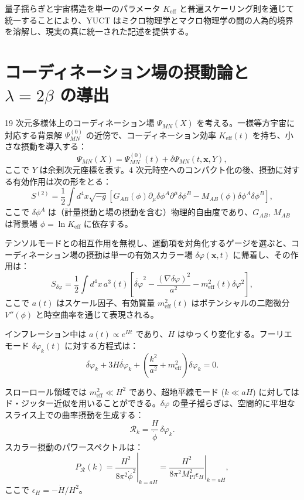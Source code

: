 \documentclass[11pt,a4paper]{article}
\newcommand{\Keff}{K_{\mathrm{eff}}}
\newcommand{\Mpl}{M_{\mathrm{Pl}}}
\begin{document}
	量子揺らぎと宇宙構造を単一のパラメータ \(K_{\mathrm{eff}}\) と普遍スケーリング則を通じて統一することにより、YUCT はミクロ物理学とマクロ物理学の間の人為的境界を溶解し、現実の真に統一された記述を提供する。
	
	\appendix
	\section{コーディネーション場の摂動論と \(\lambda = 2\beta\) の導出}
	\label{app:perturbations}
	
	19 次元多様体上のコーディネーション場 \(\Psi_{MN}(X)\) を考える。一様等方宇宙に対応する背景解 \(\Psi^{(0)}_{MN}\) の近傍で、コーディネーション効率 \(\Keff(t)\) を持ち、小さな摂動を導入する：
	\begin{equation}
		\Psi_{MN}(X) = \Psi^{(0)}_{MN}(t) + \delta\Psi_{MN}(t,\mathbf{x},Y),
	\end{equation}
	ここで \(Y\) は余剰次元座標を表す。4 次元時空へのコンパクト化の後、摂動に対する有効作用は次の形をとる：
	\begin{equation}
		S^{(2)} = \frac{1}{2} \int d^4x \sqrt{-g} \left[ G_{AB}(\phi) \partial_\mu \delta\phi^A \partial^\mu \delta\phi^B - M_{AB}(\phi) \delta\phi^A \delta\phi^B \right],
	\end{equation}
	ここで \(\delta\phi^A\) は（計量摂動と場の摂動を含む）物理的自由度であり、\(G_{AB}\), \(M_{AB}\) は背景場 \(\phi = \ln\Keff\) に依存する。
	
	テンソルモードとの相互作用を無視し、運動項を対角化するゲージを選ぶと、コーディネーション場の摂動は単一の有効スカラー場 \(\delta\varphi(\mathbf{x},t)\) に帰着し、その作用は：
	\begin{equation}
		S_{\delta\varphi} = \frac{1}{2} \int d^4x \, a^3(t) \left[ \dot{\delta\varphi}^2 - \frac{(\nabla\delta\varphi)^2}{a^2} - m_{\mathrm{eff}}^2(t) \delta\varphi^2 \right],
	\end{equation}
	ここで \(a(t)\) はスケール因子、有効質量 \(m_{\mathrm{eff}}^2(t)\) はポテンシャルの二階微分 \(V''(\phi)\) と時空曲率を通じて表現される。
	
	インフレーション中は \(a(t) \propto e^{Ht}\) であり、\(H\) はゆっくり変化する。フーリエモード \(\delta\varphi_k(t)\) に対する方程式は：
	\begin{equation}
		\ddot{\delta\varphi}_k + 3H\dot{\delta\varphi}_k + \left( \frac{k^2}{a^2} + m_{\mathrm{eff}}^2 \right) \delta\varphi_k = 0.
	\end{equation}
	
	スローロール領域では \(m_{\mathrm{eff}}^2 \ll H^2\) であり、超地平線モード (\(k \ll aH\)) に対してはド・ジッター近似を用いることができる。\(\delta\varphi\) の量子揺らぎは、空間的に平坦なスライス上での曲率摂動を生成する：
	\begin{equation}
		\mathcal{R}_k = \frac{H}{\dot{\phi}} \, \delta\varphi_k.
	\end{equation}
	スカラー摂動のパワースペクトルは：
	\begin{equation}
		P_{\mathcal{R}}(k) = \left. \frac{H^2}{8\pi^2 \dot{\phi}^2} \right|_{k=aH} = \left. \frac{H^2}{8\pi^2 \Mpl^2 \epsilon_H} \right|_{k=aH},
	\end{equation}
	ここで \(\epsilon_H = -\dot{H}/H^2\)。
	
\end{document}
